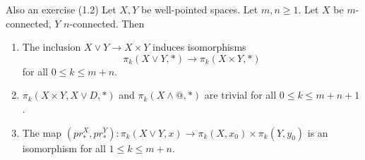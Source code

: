 \documentclass[language=english]{TemplateLecture}
\begin{document}
\begin{proposition}
    Also an exercise (1.2) Let \(X,Y\) be well-pointed spaces. Let \(m,n \geq 1\). Let \(X\) be \(m\)-connected, \(Y\) \(n\)-connected. Then
    \begin{enumerate}
        \item The inclusion \(X\vee Y\to X\times Y\) induces isomorphisms
        \[\pi_k(X\vee Y, *) \to \pi_k(X\times Y, *)\]
        for all \(0 \leq k \leq m+n\).
        \item \(\pi_k(X\times Y, X\vee D, *)\) and \(\pi_k(X\wedge @, *)\) are trivial for all \(0 \leq k\leq m+n+1\).
        \item The map \((pr_*^X, pr_*^Y)\colon \pi_k(X\vee Y, x) \to \pi_k(X, x_0)\times \pi_k(Y, y_0)\) is an isomorphism for all \(1 \leq k \leq m+n\).
    \end{enumerate}
\end{proposition}
\end{document}
